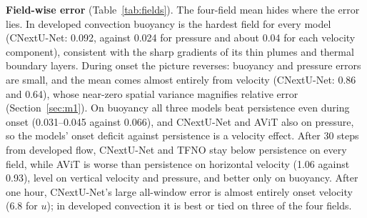 \documentclass[11pt]{article}
\begin{document}
\textbf{Field-wise error} (Table~\ref{tab:fields}). The four-field mean hides where the error lies. In developed
convection buoyancy is the hardest field for every model (CNextU-Net: 0.092, against 0.024 for pressure and about
0.04 for each velocity component), consistent with the sharp gradients of its thin plumes and thermal boundary
layers. During onset the picture reverses: buoyancy and pressure errors are small, and the mean comes almost
entirely from velocity (CNextU-Net: 0.86 and 0.64), whose near-zero spatial variance magnifies relative error
(Section~\ref{sec:m1}). On buoyancy all three models beat persistence even during onset (0.031--0.045 against
0.066), and CNextU-Net and AViT also on pressure, so the models' onset deficit against persistence is a velocity
effect. After 30 steps from developed flow, CNextU-Net and TFNO stay below persistence on every field, while AViT is
worse than persistence on horizontal velocity (1.06 against 0.93), level on vertical velocity and pressure, and
better only on buoyancy. After one hour, CNextU-Net's large all-window error is almost entirely onset velocity (6.8
for $u$); in developed convection it is best or tied on three of the four fields.
\end{document}
